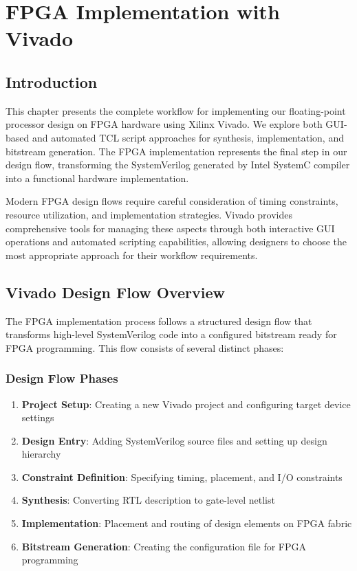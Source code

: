 \chapter{FPGA Implementation with Vivado}
\label{chap:vivado_implementation}

\section{Introduction}

This chapter presents the complete workflow for implementing our floating-point processor design on FPGA hardware using Xilinx Vivado. We explore both GUI-based and automated TCL script approaches for synthesis, implementation, and bitstream generation. The FPGA implementation represents the final step in our design flow, transforming the SystemVerilog generated by Intel SystemC compiler into a functional hardware implementation.

Modern FPGA design flows require careful consideration of timing constraints, resource utilization, and implementation strategies. Vivado provides comprehensive tools for managing these aspects through both interactive GUI operations and automated scripting capabilities, allowing designers to choose the most appropriate approach for their workflow requirements.

\section{Vivado Design Flow Overview}
\label{sec:design_flow_overview}

The FPGA implementation process follows a structured design flow that transforms high-level SystemVerilog code into a configured bitstream ready for FPGA programming. This flow consists of several distinct phases:

\subsection{Design Flow Phases}

\begin{enumerate}
    \item \textbf{Project Setup}: Creating a new Vivado project and configuring target device settings
    \item \textbf{Design Entry}: Adding SystemVerilog source files and setting up design hierarchy
    \item \textbf{Constraint Definition}: Specifying timing, placement, and I/O constraints
    \item \textbf{Synthesis}: Converting RTL description to gate-level netlist
    \item \textbf{Implementation}: Placement and routing of design elements on FPGA fabric
    \item \textbf{Bitstream Generation}: Creating the configuration file for FPGA programming
\end{enumerate}

